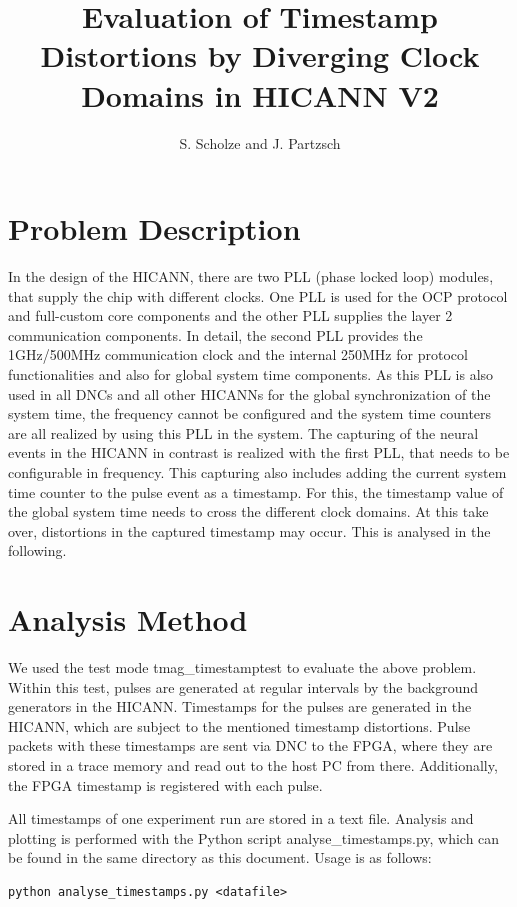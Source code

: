 \documentclass{article}
\begin{document}
 
\title{Evaluation of Timestamp Distortions by Diverging Clock Domains in HICANN V2}
\author{S. Scholze and J. Partzsch}
\maketitle

\section{Problem Description}

In the design of the HICANN, there are two PLL (phase locked loop) modules, that supply the chip with different clocks.
One PLL is used for the OCP protocol and full-custom core components and the other PLL supplies the layer 2 communication components.
In detail, the second PLL provides the 1GHz/500MHz communication clock and the internal 250MHz for protocol functionalities and also for global system time components.
As this PLL is also used in all DNCs and all other HICANNs for the global synchronization of the system time, the frequency cannot be configured and the system time counters are all realized by using this PLL in the system.
The capturing of the neural events in the HICANN in contrast is realized with the first PLL, that needs to be configurable in frequency.
This capturing also includes adding the current system time counter to the pulse event as a timestamp.
For this, the timestamp value of the global system time needs to cross the different clock domains.
At this take over, distortions in the captured timestamp may occur.
This is analysed in the following.

\section{Analysis Method}

We used the test mode tmag\_timestamptest to evaluate the above problem.
Within this test, pulses are generated at regular intervals by the background generators in the HICANN.
Timestamps for the pulses are generated in the HICANN, which are subject to the mentioned timestamp distortions.
Pulse packets with these timestamps are sent via DNC to the FPGA, where they are stored in a trace memory and read out to the host PC from there.
Additionally, the FPGA timestamp is registered with each pulse.

All timestamps of one experiment run are stored in a text file.
Analysis and plotting is performed with the Python script analyse\_timestamps.py, which can be found in the same directory as this document.
Usage is as follows:
\begin{verbatim}
python analyse_timestamps.py <datafile>
\end{verbatim}
\end{document}
